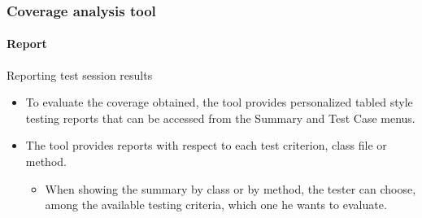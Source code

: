 \begin{frame}[parent={cmap:coverage-analysis-tool},hasnext=true,hasprev=true]
\frametitle{Coverage analysis tool}
\framesubtitle{Report}
\label{concept:jabuti-report}

\begin{block:fact}{Reporting test session results}
\begin{itemize}
	\item To evaluate the coverage obtained, the tool provides personalized
	tabled style testing reports that can be accessed from the Summary and Test
	Case menus.

	\item The tool provides reports with respect to each test criterion,
	class file or method.
	\begin{itemize}
		\item When showing the summary by class or by method, the tester can
		choose, among the available testing criteria, which one he wants to
		evaluate.
	\end{itemize}
\end{itemize}
\end{block:fact}
\end{frame}

